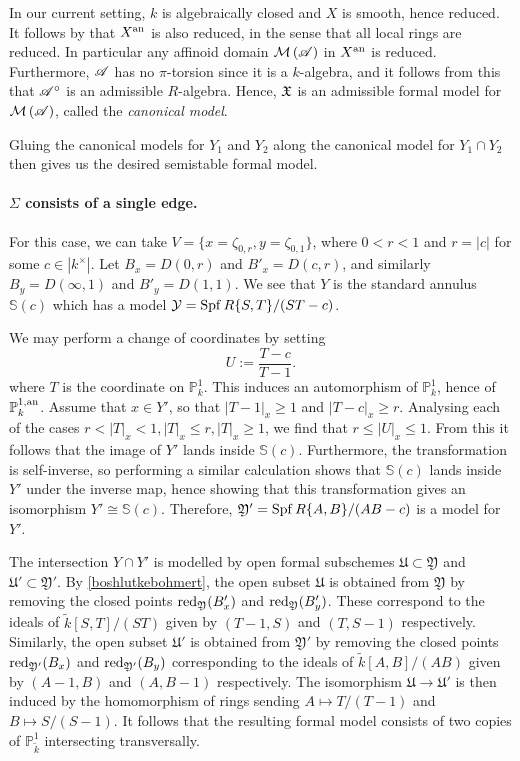 In our current setting, $k$ is algebraically closed and $X$ is smooth, hence reduced.
It follows by \parencite[Proposition 3.4.3]{berk1} that $X^{\text{an}}$ is also reduced, in the sense that all local rings are reduced. 
In particular any affinoid domain $\mathcal{M}\left(\mathscr{A}\right)$ in $X^{\text{an}}$ is reduced.
Furthermore, $\mathscr{A}$ has no $\pi$-torsion since it is a $k$-algebra, and it follows from this that $\mathscr{A}^{\circ}$ is an admissible $R$-algebra.
Hence, $\mathfrak{X}$ is an admissible formal model for $\mathcal{M}\left(\mathscr{A}\right)$, called the \textit{canonical model}.

Gluing the canonical models for $Y_1$ and $Y_2$ along the canonical model for $Y_1 \cap Y_2$ then gives us the desired semistable formal model.

\paragraph{$\Sigma$ consists of a single edge.}
For this case, we can take $V = \{x = \zeta_{0, r}, y = \zeta_{0 , 1} \}$, where $0 < r < 1$ and $r = |c|$ for some $c \in |k^{\times}|$.
Let $B_x = D(0, r)$ and $B'_x = D(c, r)$, and similarly $B_y = D(\infty, 1)$ and $B'_y = D(1, 1)$.
We see that $Y$ is the standard annulus $\mathbb{S}(c)$ which has a model $\mathcal{Y} = \operatorname{Spf} R\{S, T\}/(S T - c)$.

We may perform a change of coordinates by setting
\[
    U := \frac{T - c}{T - 1}.
\]
where $T$ is the coordinate on $\mathbb{P}^{1}_{k}$. 
This induces an automorphism of $\mathbb{P}^{1}_{k}$, hence of $\mathbb{P}^{1, \text{an}}_{k}$.
Assume that $x \in Y'$, so that $|T - 1|_x \geq 1$ and $|T - c|_x \geq r$.
Analysing each of the cases $r < |T|_x < 1, |T|_x \leq r, |T|_x \geq 1$, we find that $r \leq |U|_x \leq 1$.
From this it follows that the image of $Y'$ lands inside $\mathbb{S}(c)$.
Furthermore, the transformation is self-inverse, so performing a similar calculation shows that $\mathbb{S}(c)$ lands inside $Y'$ under the inverse map, hence showing that this transformation gives an isomorphism $Y' \cong \mathbb{S}(c)$.
Therefore, $\mathfrak{Y}' = \operatorname{Spf} R\{A, B\}/(A B - c)$ is a model for $Y'$.

The intersection $Y \cap Y'$ is modelled by open formal subschemes $\mathfrak{U} \subset \mathfrak{Y}$ and $\mathfrak{U}' \subset \mathfrak{Y}'$.
By \cref{boshlutkebohmert}, the open subset $\mathfrak{U}$ is obtained from $\mathfrak{Y}$ by removing the closed points $\operatorname{red}_{\mathfrak{Y}}(B'_x)$ and $\operatorname{red}_{\mathfrak{Y}}(B'_y)$.
These correspond to the ideals of $\tilde{k}[S, T]/(S T)$ given by $(T - 1, S)$ and $(T, S - 1)$ respectively.
Similarly, the open subset $\mathfrak{U}'$ is obtained from $\mathfrak{Y}'$ by removing the closed points $\operatorname{red}_{\mathfrak{Y}'}(B_x)$ and $\operatorname{red}_{\mathfrak{Y}'}(B_y)$ corresponding to the ideals
of $\tilde{k}[A, B]/(A B)$ given by $(A - 1, B)$ and $(A, B - 1)$ respectively.
The isomorphism $\mathfrak{U} \to \mathfrak{U}'$ is then induced by the homomorphism of rings sending $A \mapsto T/(T - 1)$ and $B \mapsto S/(S - 1)$.
It follows that the resulting formal model consists of two copies of $\mathbb{P}^{1}_{\tilde{k}}$ intersecting transversally.

